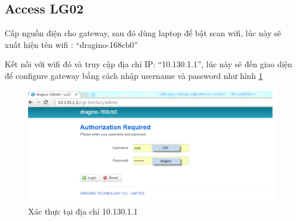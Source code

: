 \subsection{Access LG02}
Cấp nguồn điện cho gateway, sau đó dùng laptop để bật scan wifi, lúc này sẽ xuất hiện tên wifi : “dragino-168cb0”

Kết nối với wifi đó và truy cập địa chỉ IP: “10.130.1.1”, lúc này sẽ đến giao diện để configure gateway bằng cách nhập username và password như hình \ref{fig:gateway_configure}
\begin{figure}[H]
    \includegraphics[width=\textwidth]{images/Quanh/Gateway_configure.png}
    \caption{Xác thực tại địa chỉ 10.130.1.1}
    \label{fig:gateway_configure}
\end{figure}

